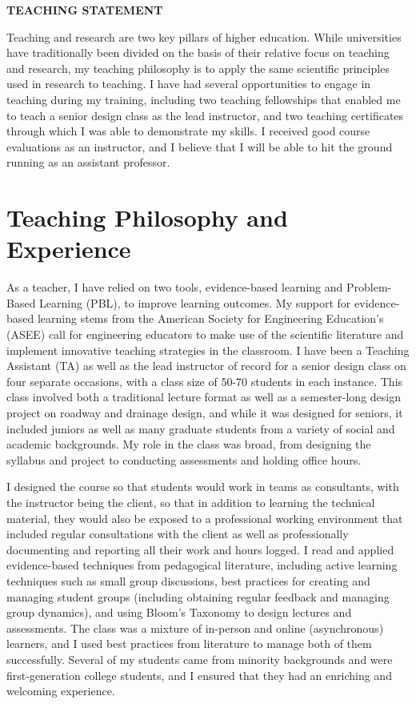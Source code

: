 \documentclass[12pt]{article}
\begin{document}
 \sloppy %
\begin{center}
{\large \uppercase{\textbf{Teaching Statement}}}
\end{center}

Teaching and research are two key pillars of higher education. While universities have traditionally been divided on the basis of their relative focus on teaching and research, my teaching philosophy is to apply the same scientific principles used in research to teaching. I have had several opportunities to engage in teaching during my training, including two teaching fellowships that enabled me to teach a senior design class as the lead instructor, and two teaching certificates through which I was able to demonstrate my skills. I received good course evaluations as an instructor, and I believe that I will be able to hit the ground running as an assistant professor.

\section*{Teaching Philosophy and Experience}
As a teacher, I have relied on two tools, evidence-based learning and Problem-Based Learning (PBL), to improve learning outcomes. My support for evidence-based learning stems from the American Society for Engineering Education's (ASEE) call for engineering educators to make use of the scientific literature and implement innovative teaching strategies in the classroom. I have been a Teaching Assistant (TA) as well as the lead instructor of record for a senior design class on four separate occasions, with a class size of 50-70 students in each instance. This class involved both a traditional lecture format as well as a semester-long design project on roadway and drainage design, and while it was designed for seniors, it included juniors as well as many graduate students from a variety of social and academic backgrounds. My role in the class was broad, from designing the syllabus and project to conducting assessments and holding office hours. 

I designed the course so that students would work in teams as consultants, with the instructor being the client, so that in addition to learning the technical material, they would also be exposed to a professional working environment that included regular consultations with the client as well as professionally documenting and reporting all their work and hours logged. I read and applied evidence-based techniques from pedagogical literature, including active learning techniques such as small group discussions, best practices for creating and managing student groups (including obtaining regular feedback and managing group dynamics), and using Bloom's Taxonomy to design lectures and assessments. The class was a mixture of in-person and online (asynchronous) learners, and I used best practices from literature to manage both of them successfully. Several of my students came from minority backgrounds and were first-generation college students, and I ensured that they had an enriching and welcoming experience.
\end{document}
